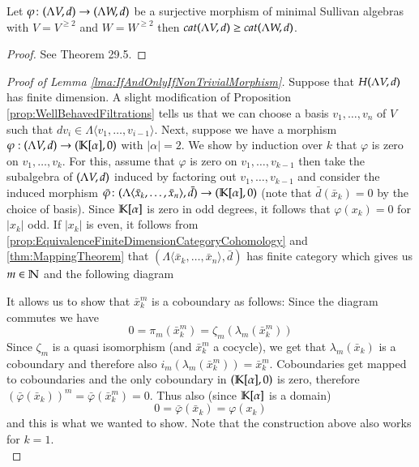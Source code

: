   \begin{Theorem}
  \label{thm:MappingTheorem}
   Let $\varphi \colon (\Lambda V,d) \to (\Lambda W,d)$ be a surjective morphism of minimal Sullivan algebras with $V = V^{\geq 2}$
   and $W = W^{\geq 2}$ then $cat (\Lambda V,d) \geq cat(\Lambda W,d)$.
  \end{Theorem}
  \begin{proof}
   See \cite{Felix2001} Theorem 29.5.
  \end{proof}

  
  
 \begin{proof}[Proof of Lemma \ref{lma:IfAndOnlyIfNonTrivialMorphism}]
 
  
  Suppose that $H(\Lambda V,d)$ has finite dimension. A slight modification of Proposition \ref{prop:WellBehavedFiltrations} tells us that we can 
  choose a basis $v_1, \ldots , v_n$ of $V$ such that $d v_i \in \Lambda \langle v_1, \ldots, v_{i-1} \rangle$.
  Next, suppose we have a morphism  $ \varphi : (\Lambda V,d) \to (\mathbb{K}[\alpha],0)$ with  $|\alpha| = 2 $. We show by induction over $k$ that
  $\varphi$ is zero on $v_1 , \ldots, v_k$.
  For this, assume that $\varphi$ is zero on $v_1, \ldots, v_{k-1}$ then take the
  subalgebra of $(\Lambda V,d)$ induced by factoring out $v_1, \ldots, v_{k-1}$ and consider the induced morphism 
  $\bar{\varphi} \colon (\Lambda \langle \bar{x}_k, \ldots, \bar{x}_n \rangle , \bar{d}) \to (\mathbb{K}[\alpha],0) $
  (note that $\bar{d}(\bar{x}_k) = 0$ by the  choice of basis). Since $\mathbb{K}[\alpha]$ is zero in odd degrees,
  it follows that $\varphi(x_k) = 0$ for $|x_k|$ odd. If $|x_k|$ is even,
  it follows from \ref{prop:EquivalenceFiniteDimensionCategoryCohomology} and \ref{thm:MappingTheorem} 
  that $(\Lambda \langle \bar{x}_k, \ldots, \bar{x}_n \rangle , \bar{d})$ has finite category which gives us  $m \in \mathbb{N}$ and the
  following diagram
  
  \centerline {
  }
  It allows us to show that $\bar{x}_k^m$ is a coboundary as follows:
  Since the diagram commutes we have
  $$0 = \pi_m(\bar{x}_k^m) =   \zeta_m (\lambda_m (\bar{x}_k^m))$$ 
   Since $\zeta_m$ is a quasi isomorphism (and $\bar{x}_k^m$ a cocycle), we get that $\lambda_m (\bar{x}_k)$ is a coboundary and
  therefore also $ i_m (\lambda_m (\bar{x}_k^m)) = \bar{x}_k^m$. Coboundaries get mapped to coboundaries and the only coboundary
  in $(\mathbb{K}[\alpha], 0)$ is zero, therefore 
  $(\bar{\varphi}(\bar{x}_k))^m = \bar{\varphi}(\bar{x}_k^m) = 0$. Thus also (since $\mathbb{K}[\alpha]$ is a domain)
  $$ 0 = \bar{\varphi}(\bar{x}_k) = \varphi( x_k)$$
  and this is what we wanted to show. Note that the construction above also works for $k = 1$. \\
  

\end{proof}
